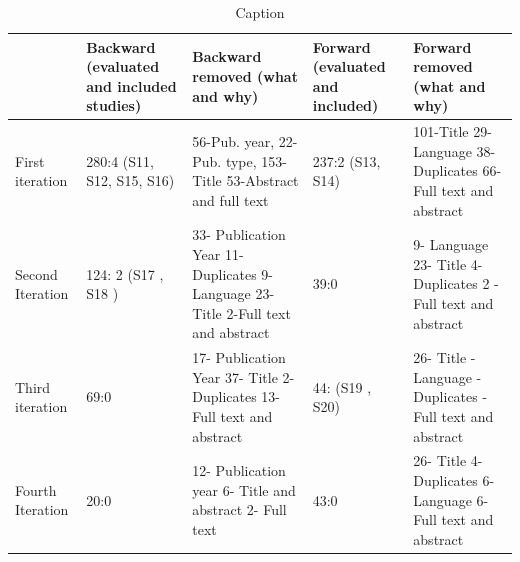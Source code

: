 \documentclass{article}
\begin{document}
\begin{table}[]
    
    \hline
    \begin{tabular}{|p{1.5cm}|p{2.5cm}|p{2.5cm}|p{2cm}|p{2cm}|}
   
         &  Backward (evaluated and included studies) & Backward removed (what and why) & Forward (evaluated and included) & Forward removed (what and why) \\
          \hline
       First iteration  &  280:4 \newline (S11\cite{metsa2007testing}, S12\cite{bjarnason2015industrial}, S15\cite{ferguson2006empirical}, S16\cite{bjarnason2014alignment}) & 56-Pub. year, 22-Pub. type, 153-Title
53-Abstract and full text & 237:2 \newline (S13\cite{aichernig2014integration}, S14\cite{bjarnason2015industrial}) & 101-Title 29-Language 38- Duplicates 66- Full text and abstract \\
\hline
Second Iteration & 124: 2 \newline (S17 \cite{melnik2006executable}, S18 \cite{bjarnason2013distances}) & 33- Publication Year 11- Duplicates 9- Language 23- Title 2-Full text  and abstract & 39:0 & 9- Language 23- Title 4- Duplicates 2 - Full text and abstract \\
\hline
Third iteration & 69:0 & 17- Publication Year 37- Title 2- Duplicates 13- Full text and abstract & 44: \newline 2 (S19 \cite{melnik2004suitability}, S20) & 26- Title \newline 6- Language \newline 4-Duplicates \newline 8-Full text and abstract \\
Fourth Iteration & 20:0 & 12- Publication year 6- Title and abstract 2- Full text & 43:0 & 26- Title 4- Duplicates 6- Language 6-Full text and abstract \\
\hline
    \end{tabular}
    \caption{Caption}
    \label{tab:my_label}
\end{table}

\end{document}

